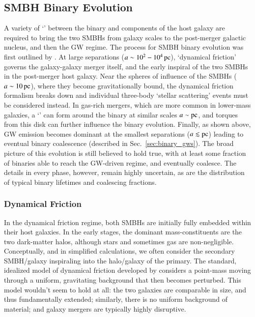 \documentclass[onecolumn,authoryear]{els-mrw}
\begin{document}
\subsection{SMBH Binary Evolution}\label{sec:binary_evolution}


A variety of `' between the binary and components of the host galaxy are required to bring the two SMBHs from galaxy scales to the post-merger galactic nucleus, and then the GW regime.  The process for SMBH binary evolution was first outlined by \citet{Begelman+1980}.  At large separations ($a \sim 10^2 - 10^4 \, \mathrm{pc}$), `dynamical friction' governs the galaxy-galaxy merger itself, and the early inspiral of the two SMBHs in the post-merger host galaxy.  Near the spheres of influence of the SMBHs ($a \sim 10 \, \mathrm{pc}$), where they become gravitationally bound, the dynamical friction formalism breaks down and individual three-body `stellar scattering' events must be considered instead.  In gas-rich mergers, which are more common in lower-mass galaxies, a `' can form around the binary at similar scales $a \sim \mathrm{pc}$, and torques from this disk can further influence the binary evolution.  Finally, as shown above, GW emission becomes dominant at the smallest separations ($a \lesssim \mathrm{pc}$) leading to eventual binary coalescence (described in Sec.~\ref{sec:binary_gws}).  The broad picture of this evolution is still believed to hold true, with at least some fraction of binaries able to reach the GW-driven regime, and eventually coalesce.  The details in every phase, however, remain highly uncertain, as are the distribution of typical binary lifetimes and coalescing fractions.

\subsubsection{Dynamical Friction}

In the dynamical friction regime, both SMBHs are initially fully embedded within their host galaxies.  In the early stages, the dominant mass-constituents are the two dark-matter halos, although stars and sometimes gas are non-negligible.  Conceptually, and in simplified calculations, we often consider the secondary SMBH/galaxy inspiraling into the halo/galaxy of the primary.  The standard, idealized model of dynamical friction developed by  \citet{Chandrasekhar-1943} considers a point-mass moving through a uniform, gravitating background that then becomes perturbed.  This model wouldn't seem to hold at all: the two galaxies are comparable in size, and thus fundamentally extended; similarly, there is no uniform background of material; and galaxy mergers are typically highly disruptive.
\end{document}
